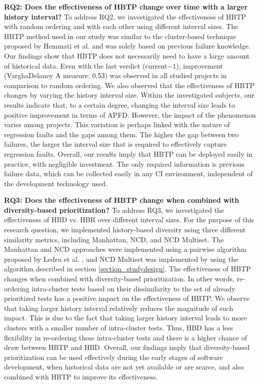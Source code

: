 \documentclass[1p]{elsarticle}
\begin{document}
\textbf{RQ2: Does the effectiveness of HBTP change over time with a larger history interval?} To address RQ2, we investigated the effectiveness of HBTP with random ordering and with each other using different interval sizes. The HBTP method used in our study was similar to the cluster-based technique proposed by Hemmati et al. \cite{hemmati2017prioritizing} and was solely based on previous failure knowledge. Our findings show that HBTP does not necessarily need to have a large amount of historical data. Even with the last verdict (current$-1$), improvement (Vargha\textendash Delaney A measure: 0.53) was observed in all studied projects in comparison to random ordering. We also observed that the effectiveness of HBTP changes by varying the history interval size. Within the investigated subjects, our results indicate that, to a certain degree, changing the interval size leads to positive improvement in terms of APFD. However, the impact of the phenomenon varies among projects. This variation is perhaps linked with the nature of regression faults and the gaps among them. The higher the gap between two failures, the larger the interval size that is required to effectively capture regression faults. Overall, our results imply that HBTP can be deployed easily in practice, with negligible investment. The only required information is previous failure data, which can be collected easily in any CI environment, independent of the development technology used.

\textbf{RQ3: Does the effectiveness of HBTP change when combined with diversity-based prioritization?} To address RQ3, we investigated the effectiveness of HBD vs. HBR over different interval sizes. For the purpose of this research question, we implemented history-based diversity using three different similarity metrics, including Manhattan, NCD, and NCD Multiset. The Manhattan and NCD approaches were implemented using a pairwise algorithm proposed by Ledru et al. \cite{ledru2012prioritizing}, and NCD Multiset was implemented by using the algorithm described in section \ref{section_studydesign}. The effectiveness of HBTP changes when combined with diversity-based prioritization. In other words, re-ordering intra-cluster tests based on their dissimilarity to the set of already prioritized tests has a positive impact on the effectiveness of HBTP. We observe that taking larger history interval relatively reduces the magnitude of such impact. This is due to the fact that taking larger history interval leads to more clusters with a smaller number of intra-cluster tests. Thus, HBD has a less flexibility in re-ordering these intra-cluster tests and there is a higher chance of draw between HBTP and HBD. Overall, our findings imply that diversity-based prioritization can be used effectively during the early stages of software development, when historical data are not yet available or are scarce, and also combined with HBTP to improve its effectiveness.
\end{document}
